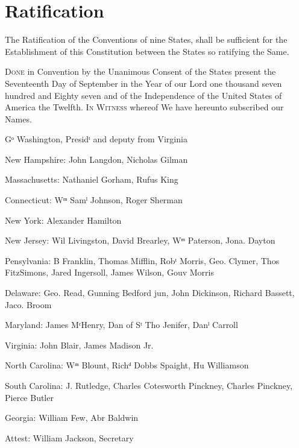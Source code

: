 \documentclass{constitution}
\begin{document}
\chapter{Ratification}
The Ratification of the Conventions of nine States,
shall be sufficient for the Establishment of this Constitution
between the States so ratifying the Same.

\textsc{Done} in Convention by the Unanimous Consent of the States present
the Seventeenth Day of September
in the Year of our Lord one thousand seven hundred and Eighty seven
and of the Independence of the United States of America the Twelfth.
\textsc{In Witness} whereof We have hereunto subscribed our Names.

Gᵒ Washington, Presidᵗ and deputy from Virginia

New Hampshire:		John Langdon, Nicholas Gilman

Massachusetts:		Nathaniel Gorham, Rufus King

Connecticut:		Wᵐ Samˡ Johnson, Roger Sherman

New York:		Alexander Hamilton

New Jersey:		Wil Livingston, David Brearley, Wᵐ Paterson, Jona. Dayton

Pensylvania:		B Franklin, Thomas Mifflin, Robᵗ Morris, Geo. Clymer, Thos FitzSimons,
			Jared Ingersoll, James Wilson, Gouv Morris

Delaware:		Geo. Read, Gunning Bedford jun, John Dickinson, Richard Bassett, Jaco. Broom

Maryland:		James MᶜHenry, Dan of Sᵗ Tho Jenifer, Danˡ Carroll

Virginia:		John Blair, James Madison Jr.

North Carolina:	Wᵐ Blount, Richᵈ Dobbs Spaight, Hu Williamson

South Carolina:	J. Rutledge, Charles Cotesworth Pinckney, Charles Pinckney, Pierce Butler

Georgia:		William Few, Abr Baldwin

Attest: William Jackson, Secretary
\end{document}

